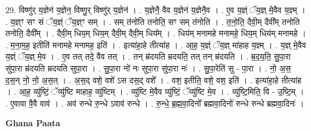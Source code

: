 \documentclass[17pt]{extarticle}
\begin{document}
29. विष्णु॑र् य॒ज्ञेन॑ य॒ज्ञेन॒ विष्णु॒र् विष्णु॑र् य॒ज्ञेन॑ । . य॒ज्ञेनै॒ वैव य॒ज्ञेन॑ य॒ज्ञेनै॒व । . ए॒व य॒ज्ञ्ं ॅय॒ज्ञ् मे॒वैव य॒ज्ञ्म् । . य॒ज्ञ्ꣳ सꣳ सं ॅय॒ज्ञ्ं ॅय॒ज्ञ्ꣳ सम् । . सम् त॑नोति तनोति॒ सꣳ सम् त॑नोति । . त॒नो॒ति॒ दैवी॒म् दैवी᳚म् तनोति तनोति॒ दैवी᳚म् । . दैवी॒म् धिय॒म् धिय॒म् दैवी॒म् दैवी॒म् धिय᳚म् । . धिय॑म् मनामहे मनामहे॒ धिय॒म् धिय॑म् मनामहे । . म॒ना॒म॒ह॒ इतीति॑ मनामहे मनामह॒ इति॑ । . इत्या॑हा॒हे तीत्या॑ह । . आ॒ह॒ य॒ज्ञ्ं ॅय॒ज्ञ् मा॑हाह य॒ज्ञ्म् । . य॒ज्ञ् मे॒वैव य॒ज्ञ्ं ॅय॒ज्ञ् मे॒व । . ए॒व तत् तदे॒ वैव तत् । . तन् म्र॑दयति म्रदयति॒ तत् तन् म्र॑दयति । . म्र॒द॒य॒ति॒ सु॒पा॒रा सु॑पा॒रा म्र॑दयति म्रदयति सुपा॒रा । . सु॒पा॒रा नो॑ नः सुपा॒रा सु॑पा॒रा नः॑ । . सु॒पा॒रेति॑ सु - पा॒रा । . नो॒ अ॒स॒ द॒स॒न् नो॒ नो॒ अ॒स॒त् । . अ॒स॒द् वशे॒ वशे॑ ऽस दस॒द् वशे᳚ । . वश॒ इतीति॒ वशे॒ वश॒ इति॑ । . इत्या॑हा॒हे तीत्या॑ह । . आ॒ह॒ व्यु॑ष्टिं॒ ॅव्यु॑ष्टि माहाह॒ व्यु॑ष्टिम् । . व्यु॑ष्टि मे॒वैव व्यु॑ष्टिं॒ ॅव्यु॑ष्टि मे॒व । . व्यु॑ष्टि॒मिति॒ वि - उ॒ष्टि॒म् । . ए॒वावा वै॒वै वाव॑ । . अव॑ रुन्धे रु॒न्धे ऽवाव॑ रुन्धे । . रु॒न्धे॒ ब्र॒ह्म॒वा॒दिनो᳚ ब्रह्मवा॒दिनो॑ रुन्धे रुन्धे ब्रह्मवा॒दिनः॑ । \newline

\textbf{Ghana Paata } \newline
\end{document}
